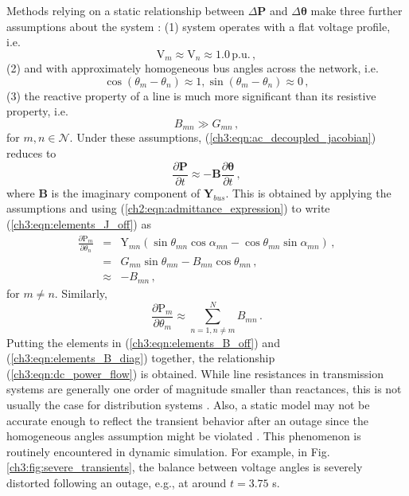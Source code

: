 Methods relying on a static relationship between $\Delta\textbf{P}$ and $\Delta\boldsymbol{\theta}$ make three further assumptions about the system \cite{Tate2008, Chen2016}: (1) system operates with a flat voltage profile, i.e. 
$$
\text{V}_m \approx \text{V}_n \approx 1.0 \, \text{p.u.} \,,
$$
(2) and with approximately homogeneous bus angles across the network, i.e. 
$$
\cos(\theta_m - \theta_n) \approx 1, \sin(\theta_m - \theta_n) \approx 0 \,,
$$ 
(3) the reactive property of a line is much more significant than its resistive property, i.e. 
$$
B_{mn} \gg G_{mn} \,,
$$ 
for $m, n \in \mathcal{N}$. Under these assumptions, (\ref{ch3:eqn:ac_decoupled_jacobian}) reduces to
\begin{equation}
\label{ch3:eqn:dc_power_flow}
\frac{\partial \textbf{P}}{\partial t} \approx -\mathbf{B} \frac{\partial \boldsymbol{\theta}}{\partial t} \,,
\end{equation}
where $\mathbf{B}$ is the imaginary component of $\boldsymbol{Y}_{bus}$. 
This is obtained by applying the assumptions and using (\ref{ch2:eqn:admittance_expression}) to write (\ref{ch3:eqn:elements_J_off}) as
\begin{eqnarray}
\label{ch3:eqn:elements_B_off}
  \frac{\partial \text{P}_{m}}{\partial \theta_{n}} 
  & = & \text{Y}_{m n} \left( \sin \theta_{mn} \cos \alpha_{mn}  - \cos \theta_{mn} \sin \alpha_{mn} \right) \,, \nonumber\\
  & = & G_{m n}\sin \theta_{mn}  - B_{mn} \cos \theta_{mn} \,, \nonumber\\
  & \approx & - B_{mn} \,,
\end{eqnarray}
for $m \neq n$. Similarly,  
\begin{equation}
\label{ch3:eqn:elements_B_diag}
\frac{\partial \text{P}_{m}}{\partial \theta_{m}} \approx \sum_{ n=1, n \neq m}^{N} B_{mn} \,.
\end{equation} 
Putting the elements in (\ref{ch3:eqn:elements_B_off}) and (\ref{ch3:eqn:elements_B_diag}) together, the relationship (\ref{ch3:eqn:dc_power_flow}) is obtained. 
While line resistances in transmission systems are generally one order of magnitude smaller than reactances, this is not usually the case for distribution systems \cite{anderson1983stability}. Also, a static model may not be accurate enough to reflect the transient behavior after an outage since the homogeneous angles assumption might be violated \cite{kaye1984analysis}. This phenomenon is routinely encountered in dynamic simulation. For example, in Fig. \ref{ch3:fig:severe_transients}, the balance between voltage angles is severely distorted following an outage, e.g., at around $t = 3.75$ s.
